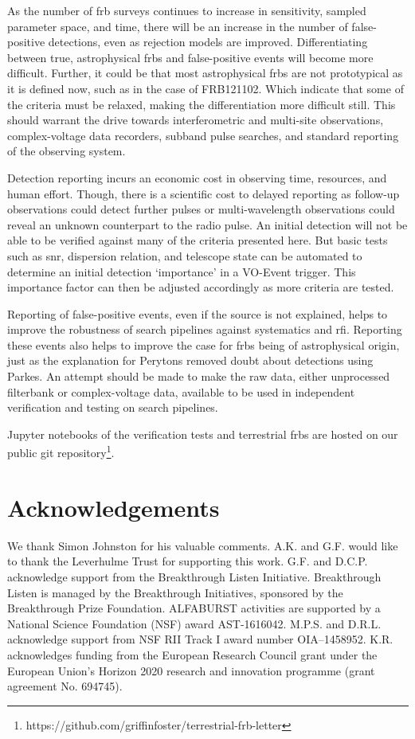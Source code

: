 \documentclass[a4paper,fleqn,usenatbib]{mnras}
\begin{document}
As the number of \gls{frb} surveys continues to increase in sensitivity, sampled
parameter space, and time, there will be an increase in the number of
false-positive detections, even as rejection models are improved.
Differentiating between true, astrophysical \glspl{frb} and false-positive
events will become more difficult.  Further, it could be that most astrophysical
\glspl{frb} are not prototypical as it is defined now, such as in the case of
FRB121102. Which indicate that some of the criteria must be relaxed,
making the differentiation more difficult still.  This should warrant the drive
towards interferometric and multi-site observations, complex-voltage data
recorders, subband pulse searches, and standard reporting of the observing
system.

Detection reporting incurs an economic cost in observing time, resources, and
human effort. Though, there is a scientific cost to delayed reporting as
follow-up observations could detect further pulses or multi-wavelength
observations could reveal an unknown counterpart to the radio pulse. An initial
detection will not be able to be verified against many of the criteria presented
here. But basic tests such as \gls{snr}, dispersion relation, and telescope
state can be automated to determine an initial detection `importance' in a
VO-Event trigger. This importance factor can then be adjusted accordingly as
more criteria are tested.

Reporting of false-positive events, even if the source is not explained, helps
to improve the robustness of search pipelines against systematics and \gls{rfi}.
Reporting these events also helps to improve the case for \glspl{frb} being of
astrophysical origin, just as the explanation for Perytons
\citep{2015MNRAS.451.3933P} removed doubt about detections using Parkes. An
attempt should be made to make the raw data, either unprocessed filterbank or
complex-voltage data, available to be used in independent verification and
testing on search pipelines.

Jupyter notebooks of the verification tests and terrestrial \glspl{frb} are
hosted on our public git
repository\footnote{https://github.com/griffinfoster/terrestrial-frb-letter}.

\section*{Acknowledgements}

We thank Simon Johnston for his valuable comments.  A.K. and G.F. would like to
thank the Leverhulme Trust for supporting this work.  G.F. and D.C.P.
acknowledge support from the Breakthrough Listen Initiative.  Breakthrough
Listen is managed by the Breakthrough Initiatives, sponsored by the Breakthrough
Prize Foundation.  ALFABURST activities are supported by a National Science
Foundation (NSF) award AST-1616042. M.P.S. and D.R.L. acknowledge support from
NSF RII Track I award number OIA--1458952. K.R. acknowledges funding from the
European Research Council grant under the European Union’s Horizon 2020 research
and innovation programme (grant agreement No. 694745).


 

\bsp	%
\label{lastpage}
\end{document}
